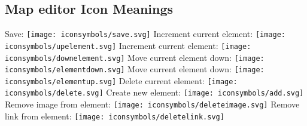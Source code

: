 \subsection{Map editor Icon Meanings}\label{map-editor-icon-meanings}

Save: \texttt{[image: iconsymbols/save.svg]} Increment current element:
\texttt{[image: iconsymbols/upelement.svg]} Increment current element:
\texttt{[image: iconsymbols/downelement.svg]} Move current element down:
\texttt{[image: iconsymbols/elementdown.svg]} Move current element down:
\texttt{[image: iconsymbols/elementup.svg]} Delete current element:
\texttt{[image: iconsymbols/delete.svg]} Create new element:
\texttt{[image: iconsymbols/add.svg]} Remove image from element:
\texttt{[image: iconsymbols/deleteimage.svg]} Remove link from element:
\texttt{[image: iconsymbols/deletelink.svg]}
